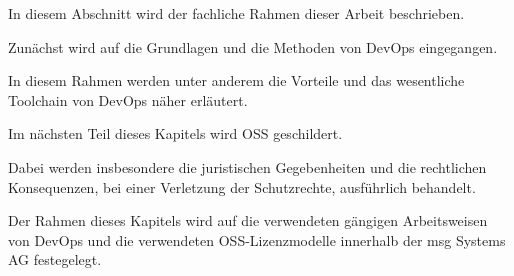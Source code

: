 In diesem Abschnitt wird der fachliche Rahmen dieser Arbeit beschrieben. 

Zunächst wird auf die Grundlagen und die Methoden von DevOps eingegangen. 

In diesem Rahmen werden unter anderem die Vorteile und das wesentliche Toolchain von DevOps näher erläutert.  

Im nächsten Teil dieses Kapitels wird OSS geschildert. 

Dabei werden insbesondere die juristischen Gegebenheiten und die rechtlichen Konsequenzen, bei einer Verletzung der Schutzrechte, ausführlich behandelt. 

Der Rahmen dieses Kapitels wird auf die verwendeten gängigen Arbeitsweisen von DevOps und die verwendeten OSS-Lizenzmodelle innerhalb der msg Systems AG festegelegt. 